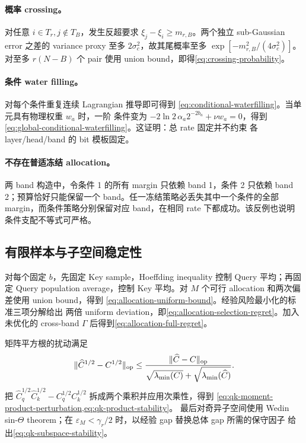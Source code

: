 \paragraph{概率 crossing。}
对任意 $i\in T_r,j\notin T_B$，发生反超要求
$\xi_j-\xi_i\ge m_{r,B}$。两个独立 sub-Gaussian error 之差的 variance
proxy 至多 $2\sigma_c^2$，故其尾概率至多
$\exp[-m_{r,B}^2/(4\sigma_c^2)]$。对至多 $r(N-B)$ 个 pair 使用 union
bound，即得\cref{eq:crossing-probability}。

\paragraph{条件 water filling。}
对每个条件重复连续 Lagrangian 推导即可得到
\cref{eq:conditional-waterfilling}。当单元具有物理权重 $w_a$ 时，一阶
条件变为
$-2\ln2\,\alpha_a2^{-2b_a}+\nu w_a=0$，得到
\cref{eq:global-conditional-waterfilling}。这证明：总 rate 固定并不约束
各 layer/head/band 的 bit 模板固定。

\paragraph{不存在普适冻结 allocation。}
两 band 构造中，令条件 1 的所有 margin 只依赖 band 1，条件 2 只依赖
band 2；预算恰好只能保留一个 band。任一冻结策略必丢失其中一个条件的全部
margin，而条件策略分别保留对应 band，在相同 rate 下都成功。该反例也说明
条件支配不等式可严格。

\subsection{有限样本与子空间稳定性}

对每个固定 $b$，先固定 Key sample，Hoeffding inequality 控制 Query
平均；再固定 Query population average，控制 Key 平均。对 $M$ 个可行
allocation 和两次偏差使用 union bound，得到
\cref{eq:allocation-uniform-bound}。经验风险最小化的标准三项分解给出
两倍 uniform deviation，即\cref{eq:allocation-selection-regret}。加入
未优化的 cross-band $\Gamma$ 后得到\cref{eq:allocation-full-regret}。

矩阵平方根的扰动满足
\begin{equation}
 \|\widehat C^{1/2}-C^{1/2}\|_{\mathrm{op}}
 \le
 \frac{\|\widehat C-C\|_{\mathrm{op}}}
 {\sqrt{\lambda_{\min}(C)}
 +\sqrt{\lambda_{\min}(\widehat C)}}.
 \label{eq:square-root-perturbation}
\end{equation}
把
$\widehat C_q^{1/2}\widehat C_k^{1/2}
-C_q^{1/2}C_k^{1/2}$
拆成两个乘积并应用次乘性，得到
\cref{eq:qk-moment-product-perturbation,eq:qk-product-stability}。
最后对奇异子空间使用 Wedin sin-$\Theta$ theorem；在
$\varepsilon_M<\gamma_r/2$ 时，以经验 gap 替换总体 gap 所需的保守因子
给出\cref{eq:qk-subspace-stability}。

